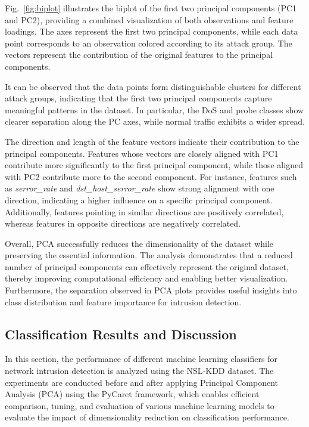 \documentclass[conference]{IEEEtran}
\begin{document}
Fig.~\ref{fig:biplot} illustrates the biplot of the first two principal components (PC1 and PC2), providing a combined visualization of both observations and feature loadings. The axes represent the first two principal components, while each data point corresponds to an observation colored according to its attack group. The vectors represent the contribution of the original features to the principal components.

It can be observed that the data points form distinguishable clusters for different attack groups, indicating that the first two principal components capture meaningful patterns in the dataset. In particular, the DoS and probe classes show clearer separation along the PC axes, while normal traffic exhibits a wider spread.

The direction and length of the feature vectors indicate their contribution to the principal components. Features whose vectors are closely aligned with PC1 contribute more significantly to the first principal component, while those aligned with PC2 contribute more to the second component. For instance, features such as \textit{serror\_rate} and \textit{dst\_host\_serror\_rate} show strong alignment with one direction, indicating a higher influence on a specific principal component. Additionally, features pointing in similar directions are positively correlated, whereas features in opposite directions are negatively correlated.

Overall, PCA successfully reduces the dimensionality of the dataset while preserving the essential information. The analysis demonstrates that a reduced number of principal components can effectively represent the original dataset, thereby improving computational efficiency and enabling better visualization. Furthermore, the separation observed in PCA plots provides useful insights into class distribution and feature importance for intrusion detection.

\subsection{Classification Results and Discussion}

In this section, the performance of different machine learning classifiers for network intrusion detection is analyzed using the NSL‑KDD dataset. The experiments are conducted before and after applying Principal Component Analysis (PCA) using the PyCaret framework, which enables efficient comparison, tuning, and evaluation of various machine learning models to evaluate the impact of dimensionality reduction on classification performance.
\end{document}
